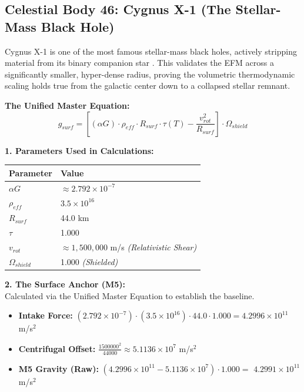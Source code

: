 \documentclass[11pt, a4paper]{article}
\begin{document}
\clearpage
\subsection{Celestial Body 46: Cygnus X-1 (The Stellar-Mass Black Hole)}
  Cygnus X-1 is one of the most famous stellar-mass black holes, actively stripping material from its binary companion star \cite{bowman2011}. This validates the EFM across a significantly smaller, hyper-dense radius, proving the volumetric thermodynamic scaling holds true from the galactic center down to a collapsed stellar remnant.

  \vspace{0.5em}
  \noindent \textbf{The Unified Master Equation:}
  $$ g_{surf} = \left[ (\alpha G) \cdot \rho_{eff} \cdot R_{surf} \cdot \tau(T) - \frac{v_{rot}^2}{R_{surf}} \right] \cdot \Omega_{shield} $$

  \vspace{0.5em}
  \noindent \textbf{1. Parameters Used in Calculations:} \\[0.5em]
  \begingroup
  \renewcommand{\arraystretch}{1.3}
  \hspace*{2em}
  \begin{tabular}{|l|l|}
    \hline
    \textbf{Parameter} & \textbf{Value} \\ \hline
    $\alpha G$ & $\approx 2.792 \times 10^{-7}$ \\ \hline
    $\rho_{eff}$ & $3.5 \times 10^{16}$ \\ \hline
    $R_{surf}$ & 44.0 km \\ \hline
    $\tau$ & 1.000 \\ \hline
    $v_{rot}$ & $\approx 1,500,000$ m/s \textit{(Relativistic Shear)} \\ \hline
    $\Omega_{shield}$ & 1.000 \textit{(Shielded)} \\ \hline
  \end{tabular}
  \endgroup

  \vspace{1.0em}
  \noindent \textbf{2. The Surface Anchor (M5):} \\
  \hspace*{1em} Calculated via the Unified Master Equation to establish the baseline.
  \begin{itemize}
    \item \textbf{Intake Force:} $(2.792 \times 10^{-7}) \cdot (3.5 \times 10^{16}) \cdot 44.0 \cdot 1.000 = 4.2996 \times 10^{11}$ m/s$^2$
    \item \textbf{Centrifugal Offset:} $\frac{1500000^2}{44000} \approx 5.1136 \times 10^{7}$ m/s$^2$
    \item \textbf{M5 Gravity (Raw):} $(4.2996 \times 10^{11} - 5.1136 \times 10^{7}) \cdot 1.000 =$ \textbf{$4.2991 \times 10^{11}$} m/s$^2$
  \end{itemize}
\end{document}
